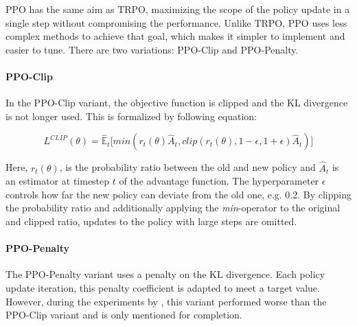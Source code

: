 


PPO has the same aim as TRPO, maximizing the scope of the policy update in a single step without compromising the performance. Unlike TRPO, PPO uses less complex methods to achieve that goal, which makes it simpler to implement and easier to tune. There are two variations: PPO-Clip and PPO-Penalty.

\paragraph{PPO-Clip} In the PPO-Clip variant, the objective function is clipped and the KL divergence is not longer used. This is formalized by following equation:

\begin{equation}
L^{CLIP} (\theta) = \mathbb{\hat{{E}}}_t    \bigg[ min (r_t(\theta) \hat{A}_t, clip (r_t(\theta), 1-\epsilon, 1+\epsilon)\hat{A}_t) \bigg]
\label{eq:ppo_clipped}
\end{equation}

Here, $r_t(\theta)$, is the probability ratio between the old and new policy and $\hat{A}_t$ is an estimator at timestep $t$ of the advantage function. The hyperparameter $\epsilon$ controls how far the new policy can deviate from the old one, e.g. 0.2. By clipping the probability ratio and additionally applying the \textit{min}-operator to the original and clipped ratio, updates to the policy with large steps are omitted.

\paragraph{PPO-Penalty} The PPO-Penalty variant uses a penalty on the KL divergence. Each policy update iteration, this penalty coefficient is adapted to meet a target value. However, during the experiments by , this variant performed worse than the PPO-Clip variant and is only mentioned for completion.
